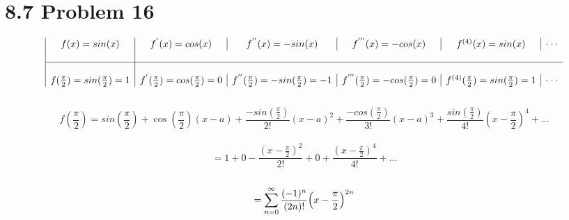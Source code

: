 \documentclass{article} %
\begin{document}
\section*{8.7 Problem 16}
\begin{displaymath}
  \begin{array}{|c|c|c|c|c|c}
    f(x)=sin(x) & f^{'}(x)=cos(x) & f^{''}(x)=-sin(x) & f^{'''}(x)=-cos(x) & f^{(4)}(x)=sin(x) & \cdot\cdot\cdot\\
    \\
    \hline
    \\
    f(\frac{\pi}{2})=sin(\frac{\pi}{2})=1 & f^{'}(\frac{\pi}{2})=cos(\frac{\pi}{2})=0 & f^{''}(\frac{\pi}{2})=-sin(\frac{\pi}{2})=-1 & f^{'''}(\frac{\pi}{2})=-cos(\frac{\pi}{2})=0 & f^{(4)}(\frac{\pi}{2})=sin(\frac{\pi}{2})=1 & \cdot\cdot\cdot\\
  \end{array}
\end{displaymath}
\\
$$f(\frac{\pi}{2}) = sin(\frac{\pi}{2}) + \cos(\frac{\pi}{2})(x-a) + \frac{-sin(\frac{\pi}{2})}{2!}(x-a)^{2} + \frac{-cos(\frac{\pi}{2})}{3!}(x-a)^{3} + \frac{sin(\frac{\pi}{2})}{4!}(x-\frac{\pi}{2})^{4} + ...$$\\
$$= 1 + 0 - \frac{(x-\frac{\pi}{2})^{2}}{2!} + 0 + \frac{(x-\frac{\pi}{2})^{4}}{4!} + ...$$\\
$$= \sum_{n=0}^{\infty} \frac{(-1)^{n}}{(2n)!}\Big{(}x-\frac{\pi}{2}\Big{)}^{2n}$$
\end{document}

